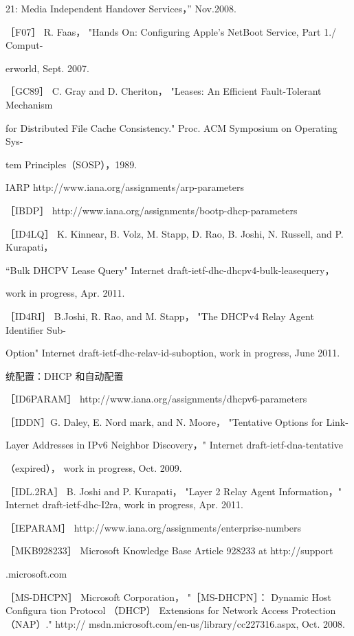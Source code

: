 21: Media Independent Handover Services，” Nov.2008.

［F07］ R. Faas， "Hands On: Configuring Apple's NetBoot Service, Part 1./ Comput-

erworld, Sept. 2007.

［GC89］ C. Gray and D. Cheriton， "Leases: An Efficient Fault-Tolerant Mechanism

for Distributed File Cache Consistency." Proc. ACM Symposium on Operating Sys-

tem Principles（SOSP），1989.

IARP http://www.iana.org/assignments/arp-parameters

［IBDP］ http://www.iana.org/assignments/bootp-dhcp-parameters

［ID4LQ］ K. Kinnear, B. Volz, M. Stapp, D. Rao, B. Joshi, N. Russell, and P. Kurapati，

“Bulk DHCPV Lease Query" Internet draft-ietf-dhc-dhcpv4-bulk-leasequery，

work in progress, Apr. 2011.

［ID4RI］ B.Joshi, R. Rao, and M. Stapp， "The DHCPv4 Relay Agent Identifier Sub-

Option" Internet draft-ietf-dhc-relav-id-suboption, work in progress, June 2011.

统配置：DHCP 和自动配置

［ID6PARAM］ http://www.iana.org/assignments/dhcpv6-parameters

［IDDN］G. Daley, E. Nord mark, and N. Moore， "Tentative Options for Link-

Layer Addresses in IPv6 Neighbor Discovery，" Internet draft-ietf-dna-tentative

（expired）， work in progress, Oct. 2009.

［IDL.2RA］ B. Joshi and P. Kurapati， "Layer 2 Relay Agent Information，" Internet
draft-ietf-dhc-I2ra, work in progress, Apr. 2011.

［IEPARAM］ http://www.iana.org/assignments/enterprise-numbers

［MKB928233］ Microsoft Knowledge Base Article 928233 at http://support

.microsoft.com

［MS-DHCPN］ Microsoft Corporation， "［MS-DHCPN］： Dynamic Host Configura
tion Protocol （DHCP） Extensions for Network Access Protection （NAP）." http://
msdn.microsoft.com/en-us/library/cc227316.aspx, Oct. 2008.